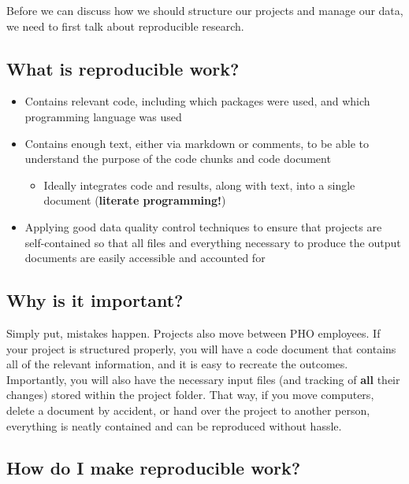 \documentclass[]{book}
\providecommand{\tightlist}{%
  \setlength{\itemsep}{0pt}\setlength{\parskip}{0pt}}
\begin{document}
Before we can discuss how we should structure our projects and manage our data, we need to first talk about reproducible research.

\hypertarget{what-is-reproducible-work}{%
\subsection{What is reproducible work?}\label{what-is-reproducible-work}}

\begin{itemize}
\tightlist
\item
  Contains relevant code, including which packages were used, and which programming language was used
\item
  Contains enough text, either via markdown or comments, to be able to understand the purpose of the code chunks and code document

  \begin{itemize}
  \tightlist
  \item
    Ideally integrates code and results, along with text, into a single document (\textbf{literate programming!})
  \end{itemize}
\item
  Applying good data quality control techniques to ensure that projects are self-contained so that all files and everything necessary to produce the output documents are easily accessible and accounted for
\end{itemize}

\hypertarget{why-is-it-important}{%
\subsection{Why is it important?}\label{why-is-it-important}}

Simply put, mistakes happen. Projects also move between PHO employees. If your project is structured properly, you will have a code document that contains all of the relevant information, and it is easy to recreate the outcomes. Importantly, you will also have the necessary input files (and tracking of \textbf{all} their changes) stored within the project folder. That way, if you move computers, delete a document by accident, or hand over the project to another person, everything is neatly contained and can be reproduced without hassle.

\hypertarget{how-do-i-make-reproducible-work}{%
\subsection{How do I make reproducible work?}\label{how-do-i-make-reproducible-work}}
\end{document}
